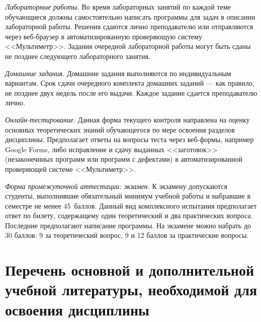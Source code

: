 \documentclass[a4paper,12pt]{article}
\begin{document}
\textit{Лабораторные работы.}\/ Во время лабораторных занятий по каждой теме
обучающиеся должны самостоятельно написать программы для задач в
описании лабораторной работы.  Решения сдаются лично преподавателю или отправляются
через веб-браузер в автоматизированную проверяющую систему <<Мультиметр>>. Задания очередной
лабораторной работы могут быть сданы не позднее следующего лабораторного занятия.
\par
\textit{Домашние задания.}\/ Домашние задания выполняются по индивидуальным вариантам.
Срок сдачи очередного комплекта домашних заданий --- как правило, не позднее двух
недель после его выдачи. Каждое задание сдается преподавателю лично.
\par
\textit{Онлайн-тестирование.}\/ Данная форма текущего контроля направлена на оценку основных
теоретических знаний обучающегося по мере освоения разделов дисциплины. Предполагает
ответы на вопросы теста через веб-формы, например Google Forms, либо
исправление и сдачу выданных <<заготовок>> (незаконечнных программ или
программ с дефектами) в автоматизированной проверяющей системе <<Мультиметр>>.
\par
\textit{Форма промежуточной аттестации: экзамен.}\/ К экзамену допускаются студенты,
выполнившие обязательный минимум учебной работы и набравшие в семестре не менее 45~баллов.
Данный вид комплексного испытания предполагает ответ по билету, содержащему один
теоретический и два практических вопроса. Последние предполагают написание программы.
На экзамене можно набрать до 30 баллов: 9 за теоретический вопрос, 9 и 12 баллов за
практические вопросы.



\newpage
\section{Перечень основной и дополнительной учебной литературы, необходимой для освоения дисциплины}
\end{document}
